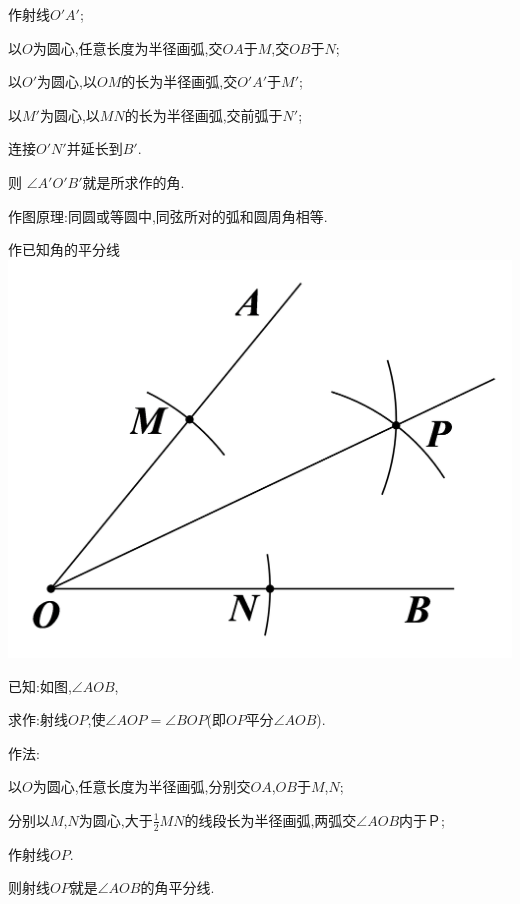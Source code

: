 \documentclass[cn,blue,12pt]{elegantbook}
\begin{document}
\begin{zsyd}
\begin{zsyd}
\begin{zsyd}
            \begin{zsyd}
            \item 作射线\(O'A'\);
            \item 以\(O\)为圆心,任意长度为半径画弧,交\(OA\)于\(M\),交\(OB\)于\(N\);
            \item 以\(O'\)为圆心,以\(OM\)的长为半径画弧,交\(O'A'\)于\(M'\);
            \item 以\(M'\)为圆心,以\(MN\)的长为半径画弧,交前弧于\(N'\);
            \item 连接\(O'N'\)并延长到\(B'\).
            \item 则 \(\angle A'O'B'\)就是所求作的角.
            \end{zsyd}
        \end{zsyd}
\begin{note}
            作图原理:同圆或等圆中,同弦所对的弧和圆周角相等.
\end{note}
    \item 作已知角的平分线\\
        \includegraphics[width=0.4\linewidth]{pic/20200515007.png}\\
        \begin{zsyd}
        \item 已知:如图,\( \angle AOB\),
        \item 求作:射线\(OP\),使\( \angle AOP= \angle BOP\)(即\(OP\)平分\( \angle AOB\)).
        \item 作法:
            \begin{zsyd}
            \item 以\(O\)为圆心,任意长度为半径画弧,分别交\(OA\),\(OB\)于\(M\),\(N\);
            \item 分别以\(M\),\(N\)为圆心,大于\(\frac{1}{2}MN\)的线段长为半径画弧,两弧交\( \angle AOB\)内于\(Ｐ\);
            \item 作射线\(OP.\)
            \item 则射线\(OP\)就是\( \angle AOB\)的角平分线.
            \end{zsyd}
        \end{zsyd}
\begin{note}

\end{note}
\end{zsyd}
\end{zsyd}
\end{document}
